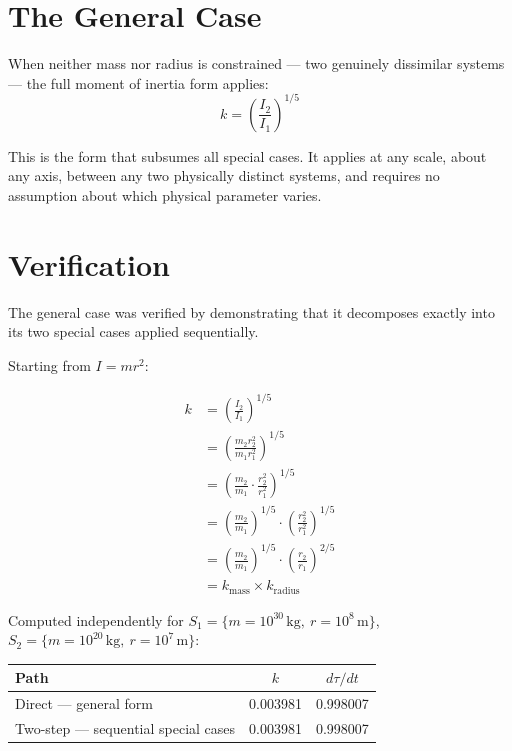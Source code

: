 \documentclass[12pt,a4paper]{article}
\begin{document}
\section{The General Case}

When neither mass nor radius is constrained --- two genuinely dissimilar systems --- the full moment of inertia form applies:
\begin{equation}
k = \left(\frac{I_2}{I_1}\right)^{1/5}
\end{equation}

This is the form that subsumes all special cases. It applies at any scale, about any axis, between any two physically distinct systems, and requires no assumption about which physical parameter varies.

\section{Verification}

The general case was verified by demonstrating that it decomposes exactly into its two special cases applied sequentially.

Starting from $I = mr^2$:

\begin{align}
k &= \left(\frac{I_2}{I_1}\right)^{1/5} \\[6pt]
  &= \left(\frac{m_2 r_2^2}{m_1 r_1^2}\right)^{1/5} \\[6pt]
  &= \left(\frac{m_2}{m_1} \cdot \frac{r_2^2}{r_1^2}\right)^{1/5} \\[6pt]
  &= \left(\frac{m_2}{m_1}\right)^{1/5} \cdot \left(\frac{r_2^2}{r_1^2}\right)^{1/5} \\[6pt]
  &= \left(\frac{m_2}{m_1}\right)^{1/5} \cdot \left(\frac{r_2}{r_1}\right)^{2/5} \\[6pt]
  &= k_{\text{mass}} \times k_{\text{radius}}
\end{align}

Computed independently for $S_1 = \{m=10^{30}\,\text{kg},\ r=10^{8}\,\text{m}\}$, $S_2 = \{m=10^{20}\,\text{kg},\ r=10^{7}\,\text{m}\}$:

\begin{center}
\begin{tabular}{lcc}
\toprule
Path & $k$ & $d\tau/dt$ \\
\midrule
Direct --- general form & 0.003981 & 0.998007 \\
Two-step --- sequential special cases & 0.003981 & 0.998007 \\
\bottomrule
\end{tabular}
\end{center}
\end{document}
